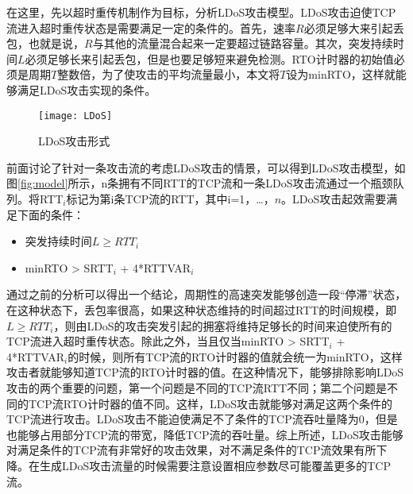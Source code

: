 在这里，先以超时重传机制作为目标，分析LDoS攻击模型。LDoS攻击迫使TCP流进入超时重传状态是需要满足一定的条件的。首先，速率$R$必须足够大来引起丢包，也就是说，$R$与其他的流量混合起来一定要超过链路容量。其次，突发持续时间$L$必须足够长来引起丢包，但是也要足够短来避免检测。RTO计时器的初始值必须是周期$T$整数倍，为了使攻击的平均流量最小，本文将$T$设为minRTO，这样就能够满足LDoS攻击实现的条件。

\begin{figure}
    \centering
    \texttt{[image: LDoS]}
    \caption{LDoS攻击形式}
    \label{fig:LDoS}
\end{figure}

前面讨论了针对一条攻击流的考虑LDoS攻击的情景，可以得到LDoS攻击模型，如图\ref{fig:model}所示，n条拥有不同RTT的TCP流和一条LDoS攻击流通过一个瓶颈队列。将RTT$_{i}$标记为第i条TCP流的RTT，其中i=1，…，$n$。LDoS攻击起效需要满足下面的条件：
\begin{itemize}
    \item 突发持续时间$L \geq RTT_i $
    \item minRTO > SRTT$_i$ + 4*RTTVAR$_i$
\end{itemize}

通过之前的分析可以得出一个结论，周期性的高速突发能够创造一段“停滞”状态，在这种状态下，丢包率很高，如果这种状态维持的时间超过RTT的时间规模，即$L \geq RTT_i$，则由LDoS的攻击突发引起的拥塞将维持足够长的时间来迫使所有的TCP流进入超时重传状态。除此之外，当且仅当minRTO > SRTT$_i$ + 4*RTTVAR$_i$的时候，则所有TCP流的RTO计时器的值就会统一为minRTO，这样攻击者就能够知道TCP流的RTO计时器的值。在这种情况下，能够排除影响LDoS攻击的两个重要的问题，第一个问题是不同的TCP流RTT不同；第二个问题是不同的TCP流RTO计时器的值不同。这样，LDoS攻击就能够对满足这两个条件的TCP流进行攻击。LDoS攻击不能迫使满足不了条件的TCP流吞吐量降为0，但是也能够占用部分TCP流的带宽，降低TCP流的吞吐量。综上所述，LDoS攻击能够对满足条件的TCP流有非常好的攻击效果，对不满足条件的TCP流效果有所下降。在生成LDoS攻击流量的时候需要注意设置相应参数尽可能覆盖更多的TCP流。





